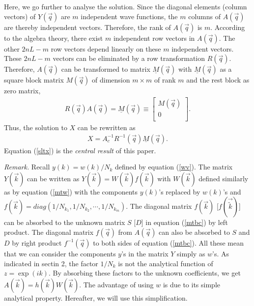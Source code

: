 \documentclass[aps,pra,amsmath,twocolumn,showpacs,bibnotes,10pt]{revtex4-1}
\begin{document}
Here, we go further to analyse the solution. Since the diagonal elements (column vectors) of $Y(\vec q)$ are $m$ independent wave functions, the $m$ columns of $A(\vec q)$ are thereby independent vectors. Therefore, the rank of $A(\vec q)$ is $m$. According to the algebra theory, there exist $m$ independent row vectors in $A(\vec q)$. The other $2nL-m$ row vectors depend linearly on these $m$ independent vectors. These $2nL-m$ vectors can be eliminated by a row transformation $R(\vec q)$. Therefore, $A(\vec q)$ can be transformed to matrix $\underline{M}(\vec q)$ with $\underline{M}(\vec q)$ as a square block matrix $M(\vec q)$ of dimension $m\times m$ of rank $m$ and the rest block as zero matrix, 
\begin{eqnarray}
R(\vec q)A(\vec q)=\underline{M}(\vec q)\equiv\begin{bmatrix}
	M(\vec q)\\
	0\\
\end{bmatrix}.  
\label{sltb}
\end{eqnarray}
Thus, the solution to $X$ can be rewritten as
\begin{eqnarray}
X = A_c^{-1}R^{-1}(\vec q)\underline{M}(\vec q). \label{sltx}
\end{eqnarray}
Equation (\ref{sltx}) is the {\it central result} of this paper.

{\it Remark.} Recall $y(k)=w(k)/N_k$ defined by equation (\ref{wv}). The matrix $Y(\vec k)$ can be written as $Y(\vec k) = W(\vec k)f(\vec k)$ with $W(\vec k)$ defined similarly as by equation (\ref{mtw}) with the components $y(k)$'s replaced by $w(k)$'s and $f(\vec k) = diag(1/N_{k_1},1/N_{k_2},\cdots,1/N_{k_m})$. The diagonal matrix $f(\vec k)$ [$f(\vec{\tilde k})$] can be absorbed to the unknown matrix $S$ [$D$] in equation (\ref{mtbc}) by left product. The diagonal matrix $f(\vec q)$ from $A(\vec q)$ can also be absorbed to $S$ and $D$ by right product $f^{-1}(\vec q)$ to both sides of equation (\ref{mtbc}). All these mean that we can consider the components $y$'s in the matrix $Y$ simply as $w$'s. As indicated in sectin 2, the factor $1/N_k$ is not the analytical function of $z = \exp(ik)$. By absorbing these factors to the unknown coefficients, we get $A(\vec k) = h(\vec k)W(\vec k)$. The advantage of using $w$ is due to its simple analytical property. Hereafter, we will use this simplification.  
\end{document}
